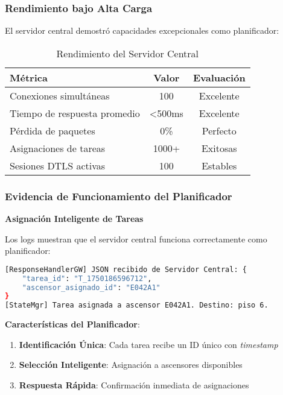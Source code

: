 \subsubsection{Rendimiento bajo Alta Carga}

El servidor central demostró capacidades excepcionales como planificador:

\begin{table}[h]
\centering
\begin{tabular}{|l|c|c|}
\hline
\textbf{Métrica} & \textbf{Valor} & \textbf{Evaluación} \\
\hline
Conexiones simultáneas & 100 & \textcolor{successgreen}{Excelente} \\
Tiempo de respuesta promedio & <500ms & \textcolor{successgreen}{Excelente} \\
Pérdida de paquetes & 0\% & \textcolor{successgreen}{Perfecto} \\
Asignaciones de tareas & 1000+ & \textcolor{successgreen}{Exitosas} \\
Sesiones DTLS activas & 100 & \textcolor{successgreen}{Estables} \\
\hline
\end{tabular}
\caption{Rendimiento del Servidor Central}
\label{tab:rendimiento-servidor-central}
\end{table}

\subsubsection{Evidencia de Funcionamiento del Planificador}

\textbf{Asignación Inteligente de Tareas}

Los logs muestran que el servidor central funciona correctamente como planificador:

\begin{lstlisting}[language=bash,caption={Ejemplo de Asignación de Tareas por el Planificador},label={lst:task-assignment}]
[ResponseHandlerGW] JSON recibido de Servidor Central: {
    "tarea_id": "T_1750186596712",
    "ascensor_asignado_id": "E042A1"
}
[StateMgr] Tarea asignada a ascensor E042A1. Destino: piso 6.
\end{lstlisting}

\textbf{Características del Planificador}:
\begin{enumerate}
    \item \textcolor{successgreen}{\textbf{Identificación Única}}: Cada tarea recibe un ID único con \textit{timestamp}
    \item \textcolor{successgreen}{\textbf{Selección Inteligente}}: Asignación a ascensores disponibles
    \item \textcolor{successgreen}{\textbf{Respuesta Rápida}}: Confirmación inmediata de asignaciones
\end{enumerate}

